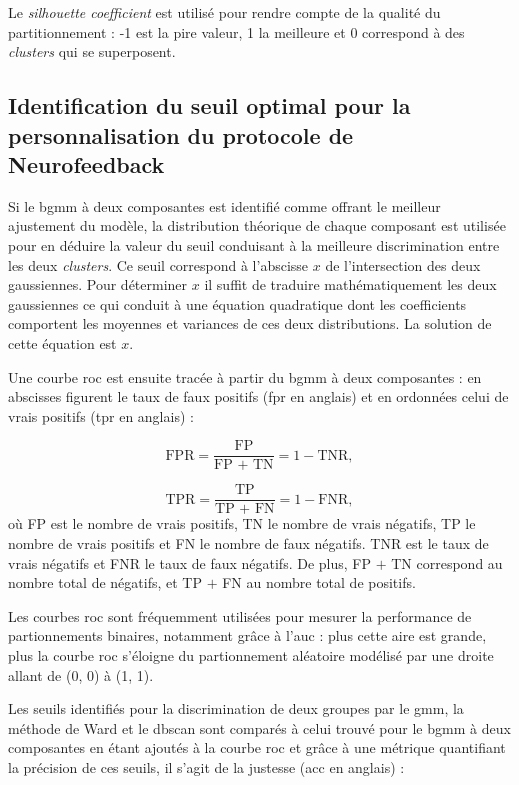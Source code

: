 Le \textit{silhouette coefficient} est utilisé pour rendre compte de la qualité du partitionnement : -1 est la pire valeur, 1 la meilleure et 0
correspond à des \textit{clusters} qui se superposent.

\subsection{Identification du seuil optimal pour la personnalisation du protocole de Neurofeedback}

Si le \gls{bgmm} à deux composantes est identifié comme offrant le meilleur ajustement du modèle, la distribution théorique de chaque composant 
est utilisée pour en déduire la valeur du seuil conduisant à la meilleure discrimination entre les deux \textit{clusters}. Ce seuil correspond
à l'abscisse $x$ de l'intersection des deux gaussiennes. Pour déterminer $x$ il suffit de traduire mathématiquement les deux gaussiennes ce qui
conduit à une équation quadratique dont les coefficients comportent les moyennes et variances de ces deux distributions. La solution de cette équation est $x$.

Une courbe \gls{roc} est ensuite tracée à partir du \gls{bgmm} à deux composantes : en abscisses figurent le taux de faux positifs (\gls{fpr} en anglais) 
et en ordonnées celui de vrais positifs (\gls{tpr} en anglais) \citep{James2013} :

\begin{equation}
\label{eq:tbr_fpr_tpr}
\text{FPR} = \frac{\text{FP}}{\text{FP + TN}} = 1 - \text{TNR},
\end{equation}

\begin{equation}
\label{eq:tbr_tpr}
\text{TPR} = \frac{\text{TP}}{\text{TP + FN}} = 1 - \text{FNR},
\end{equation}
où FP est le nombre de vrais positifs, TN le nombre de vrais négatifs, TP le nombre de vrais positifs et FN le nombre de faux négatifs. 
TNR est le taux de vrais négatifs et FNR le taux de faux négatifs.
De plus, FP $+$ TN correspond au nombre total de négatifs, et TP $+$ FN au nombre total de positifs.

Les courbes \gls{roc} sont fréquemment utilisées pour mesurer la performance de partionnements binaires, notamment grâce à
l'\gls{auc} : plus cette aire est grande, plus la courbe \gls{roc} s'éloigne du partionnement aléatoire modélisé par une droite allant
de (0, 0) à (1, 1). 

Les seuils identifiés pour la discrimination de deux groupes par le \gls{gmm}, la méthode de Ward et le \gls{dbscan} sont comparés à celui trouvé pour 
le \gls{bgmm} à deux composantes en étant ajoutés à la courbe \gls{roc} et grâce à une métrique quantifiant la précision de ces seuils, 
il s'agit de la justesse (\gls{acc} en anglais) :

